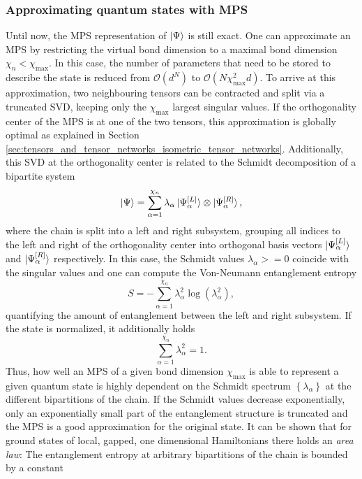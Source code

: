 \subsubsection*{\hspace{95pt}Approximating quantum states with MPS}
Until now, the MPS representation of $\ket{\Psi}$ is still exact. One can approximate an MPS by restricting the virtual bond dimension to a maximal bond dimension $\chi_n < \chi_\text{max}$. In this case, the number of parameters that need to be stored to describe the state is reduced from $\mathcal{O}\left(d^N\right)$ to $\mathcal{O}\left(N\chi_\text{max}^2 d\right)$. To arrive at this approximation, two neighbouring tensors can be contracted and split via a truncated SVD, keeping only the $\chi_\text{max}$ largest singular values. If the orthogonality center of the MPS is at one of the two tensors, this approximation is globally optimal as explained in Section \ref{sec:tensors_and_tensor_networks_isometric_tensor_networks}. Additionally, this SVD at the orthogonality center is related to the Schmidt decomposition of a bipartite system
\begin{equation}
	\ket{\Psi} = \sum_{\alpha=1}^{\chi_n} \lambda_\alpha \ket{\Psi^{[L]}_\alpha} \otimes \ket{\Psi^{[R]}_\alpha},
\end{equation}
where the chain is split into a left and right subsystem, grouping all indices to the left and right of the orthogonality center into orthogonal basis vectors $\ket{\Psi^{[L]}_\alpha}$ and $\ket{\Psi^{[R]}_\alpha}$ respectively. In this case, the Schmidt values $\lambda_\alpha >= 0$ coincide with the singular values \cite{cite:DMRG_in_the_age_of_MPS} and one can compute the Von-Neumann entanglement entropy
\begin{equation}
	S = -\sum_{\alpha=1}^{\chi_n} \lambda_\alpha^2 \log\left(\lambda_\alpha^2\right),
\end{equation}
quantifying the amount of entanglement between the left and right subsystem. If the state is normalized, it additionally holds
\begin{equation}
	\sum_{\alpha=1}^{\chi_n} \lambda_\alpha^2 = 1.
\end{equation}
Thus, how well an MPS of a given bond dimension $\chi_\text{max}$ is able to represent a given quantum state is highly dependent on the Schmidt spectrum $\left\{\lambda_\alpha\right\}$ at the different bipartitions of the chain. If the Schmidt values decrease exponentially, only an exponentially small part of the entanglement structure is truncated and the MPS is a good approximation for the original state. It can be shown \cite{cite:area_law_1D_proof, cite:area_laws_review} that for ground states of local, gapped, one dimensional Hamiltonians there holds an \textit{area law}: The entanglement entropy at arbitrary bipartitions of the chain is bounded by a constant
